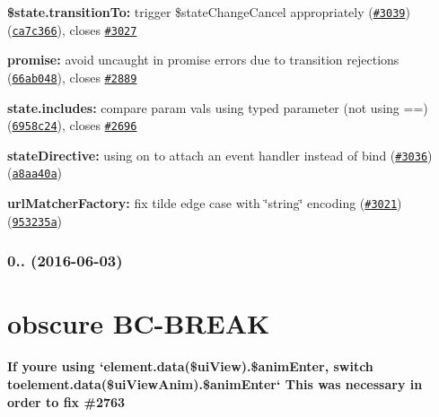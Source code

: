 {\bfseries {\bfseries 
\begin{DoxyItemize}
\item {\bfseries \$state.\+transition\+To\+:} trigger \$state\+Change\+Cancel appropriately (\href{https://github.com/angular-ui/ui-router/issues/3039}{\tt \#3039}) (\href{https://github.com/angular-ui/ui-router/commit/ca7c366}{\tt ca7c366}), closes \href{https://github.com/angular-ui/ui-router/issues/3027}{\tt \#3027}
\item {\bfseries promise\+:} avoid uncaught in promise errors due to transition rejections (\href{https://github.com/angular-ui/ui-router/commit/66ab048}{\tt 66ab048}), closes \href{https://github.com/angular-ui/ui-router/issues/2889}{\tt \#2889}
\item {\bfseries state.\+includes\+:} compare param vals using typed parameter (not using {\ttfamily ==}) (\href{https://github.com/angular-ui/ui-router/commit/6958c24}{\tt 6958c24}), closes \href{https://github.com/angular-ui/ui-router/issues/2696}{\tt \#2696}
\item {\bfseries state\+Directive\+:} using on to attach an event handler instead of bind (\href{https://github.com/angular-ui/ui-router/issues/3036}{\tt \#3036}) (\href{https://github.com/angular-ui/ui-router/commit/a8aa40a}{\tt a8aa40a})
\item {\bfseries url\+Matcher\+Factory\+:} fix tilde edge case with \char`\"{}string\char`\"{} encoding (\href{https://github.com/angular-ui/ui-router/issues/3021}{\tt \#3021}) (\href{https://github.com/angular-ui/ui-router/commit/953235a}{\tt 953235a})
\end{DoxyItemize}}}

{\bfseries {\bfseries \label{_0.3.1}%
 \subsubsection*{0.. (2016-\/06-\/03)}}}

{\bfseries {\bfseries }}

{\bfseries {\bfseries \section*{obscure B\+C-\/\+B\+R\+E\+AK}}}

{\bfseries {\bfseries }}

{\bfseries {\bfseries If you\textquotesingle{}re using `element.data(\textquotesingle{}\$ui\+View\textquotesingle{}).\$anim\+Enter{\ttfamily , switch to}element.\+data(\textquotesingle{}\$ui\+View\+Anim\textquotesingle{}).\$anim\+Enter` This was necessary in order to fix \#2763}}

